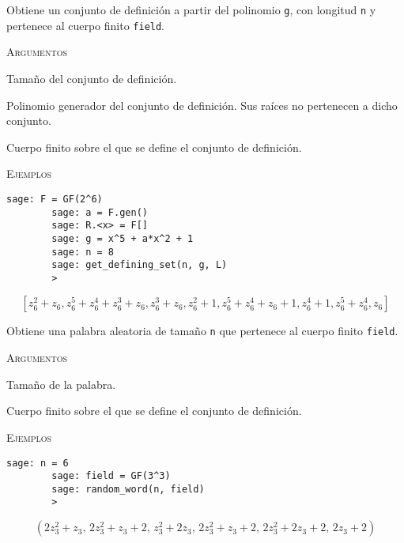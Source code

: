 \begin{description}[leftmargin=1em, font=\normalfont\ttfamily, style=nextline]
    \item[get\_defining\_set(n, pol, field)]
  
    Obtiene un conjunto de definición a partir del polinomio \texttt{g}, con longitud \texttt{n} y pertenece al cuerpo finito \texttt{field}.
  
    \textsc{Argumentos}
    \begin{description}[font=\normalfont\ttfamily]
        \item[n] Tamaño del conjunto de definición.
        \item[pol] Polinomio generador del conjunto de definición. Sus raíces no pertenecen a dicho conjunto.
        \item[field] Cuerpo finito sobre el que se define el conjunto de definición.
    \end{description}

    \textsc{Ejemplos}
    \begin{lstlisting}[gobble=4]
        sage: F = GF(2^6)
        sage: a = F.gen()
        sage: R.<x> = F[]
        sage: g = x^5 + a*x^2 + 1
        sage: n = 8
        sage: get_defining_set(n, g, L)
        > 
    \end{lstlisting}
    \[\left[z_{6}^{2} + z_{6}, z_{6}^{5} + z_{6}^{4} + z_{6}^{3} + z_{6}, z_{6}^{3} + z_{6}, z_{6}^{2} + 1, z_{6}^{5} + z_{6}^{4} + z_{6} + 1, z_{6}^{4} + 1, z_{6}^{5} + z_{6}^{4}, z_{6}\right]\]

    \item[random\_word(n, field)]
  
    Obtiene una palabra aleatoria de tamaño \texttt{n} que pertenece al cuerpo finito \texttt{field}.
  
    \textsc{Argumentos}
    \begin{description}[font=\normalfont\ttfamily]
        \item[n] Tamaño de la palabra.
        \item[field] Cuerpo finito sobre el que se define el conjunto de definición.
    \end{description}

    \textsc{Ejemplos}
    \begin{lstlisting}[gobble=4]
        sage: n = 6
        sage: field = GF(3^3)
        sage: random_word(n, field)
        > 
    \end{lstlisting}
    \[
        \left(2 z_{3}^{2} + z_{3},\,2 z_{3}^{2} + z_{3} + 2,\,z_{3}^{2} + 2 z_{3},\,2 z_{3}^{2} + z_{3} + 2,\,2 z_{3}^{2} + 2 z_{3} + 2,\,2 z_{3} + 2\right)
    \]


\end{description}
